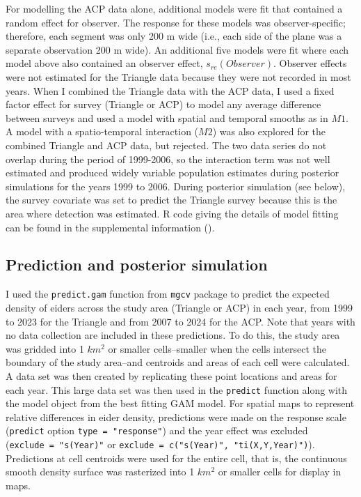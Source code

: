 \documentclass[
  10pt,
  letterpaper,
]{article}
\begin{document}
For modelling the ACP data alone, additional models were fit that
contained a random effect for observer. The response for these models
was observer-specific; therefore, each segment was only 200 m wide
(i.e., each side of the plane was a separate observation 200 m wide). An
additional five models were fit where each model above also contained an
observer effect, \(s_{re}(Observer)\). Observer effects were not
estimated for the Triangle data because they were not recorded in most
years. When I combined the Triangle data with the ACP data, I used a
fixed factor effect for survey (Triangle or ACP) to model any average
difference between surveys and used a model with spatial and temporal
smooths as in \(M1\). A model with a spatio-temporal interaction
(\(M2\)) was also explored for the combined Triangle and ACP data, but
rejected. The two data series do not overlap during the period of
1999-2006, so the interaction term was not well estimated and produced
widely variable population estimates during posterior simulations for
the years 1999 to 2006. During posterior simulation (see below), the
survey covariate was set to predict the Triangle survey because this is
the area where detection was estimated. R code giving the details of
model fitting can be found in the supplemental information
().

\subsection{Prediction and posterior
simulation}\label{prediction-and-posterior-simulation}

I used the \texttt{predict.gam} function from \texttt{mgcv} package
\citep{r-mgcv, wood2017} to predict the expected density of
eiders across the study area (Triangle or ACP) in each year, from 1999
to 2023 for the Triangle and from 2007 to 2024 for the ACP. Note that
years with no data collection are included in these predictions. To do
this, the study area was gridded into 1 \(km^2\) or smaller
cells--smaller when the cells intersect the boundary of the study
area--and centroids and areas of each cell were calculated. A data set
was then created by replicating these point locations and areas for each
year. This large data set was then used in the \texttt{predict} function
along with the model object from the best fitting GAM model. For spatial
maps to represent relative differences in eider density, predictions
were made on the response scale (\texttt{predict} option
\texttt{type\ =\ "response"}) and the year effect was excluded
(\texttt{exclude\ =\ "s(Year)"} or
\texttt{exclude\ =\ c("s(Year)",\ "ti(X,Y,Year)")}). Predictions at cell
centroids were used for the entire cell, that is, the continuous smooth
density surface was rasterized into 1 \(km^2\) or smaller cells for
display in maps.
\end{document}
